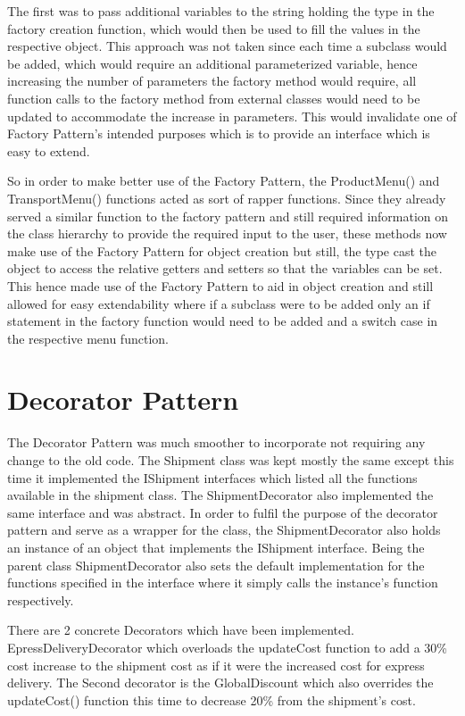 \documentclass[12pt, a4paper]{report}
\begin{document}
The first was to pass additional variables to the string holding the type in the factory creation function, which would then be used to fill the values in the respective object. This approach was not taken since each time a subclass would be added, which would require an additional parameterized variable, hence increasing the number of parameters the factory method would require, all function calls to the factory method from external classes would need to be updated to accommodate the increase in parameters. This would invalidate one of Factory Pattern's intended purposes which is to provide an interface which is easy to extend.

So in order to make better use of the Factory Pattern, the ProductMenu() and TransportMenu() functions acted as sort of rapper functions. Since they already served a similar function to the factory pattern and still required information on the class hierarchy to provide the required input to the user, these methods now make use of the Factory Pattern for object creation but still, the type cast the object to access the relative getters and setters so that the variables can be set. This hence made use of the Factory Pattern to aid in object creation and still allowed for easy extendability where if a subclass were to be added only an if statement in the factory function would need to be added and a switch case in the respective menu function.

\section{Decorator Pattern}
The Decorator Pattern was much smoother to incorporate not requiring any change to the old code. The Shipment class was kept mostly the same except this time it implemented the IShipment interfaces which listed all the functions available in the shipment class. The ShipmentDecorator also implemented the same interface and was abstract. In order to fulfil the purpose of the decorator pattern and serve as a wrapper for the class, the ShipmentDecorator also holds an instance of an object that implements the IShipment interface. Being the parent class ShipmentDecorator also sets the default implementation for the functions specified in the interface where it simply calls the instance's function respectively.

There are 2 concrete Decorators which have been implemented. EpressDeliveryDecorator which overloads the updateCost function to add a 30\% cost increase to the shipment cost as if it were the increased cost for express delivery. The Second decorator is the GlobalDiscount which also overrides the updateCost() function this time to decrease 20\% from the shipment's cost. 
\end{document}

